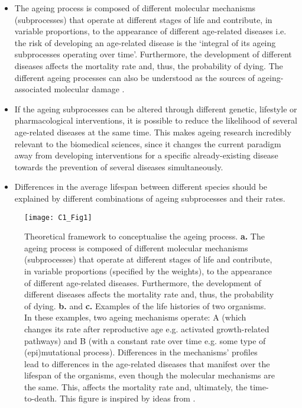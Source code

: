 \begin{itemize}
	
	\item The ageing process is composed of different molecular mechanisms (subprocesses) that operate at different stages of life and contribute, in variable proportions, to the appearance of different age-related diseases i.e. the risk of developing an age-related disease is the `integral of its ageing subprocesses operating over time'. Furthermore, the development of different diseases affects the mortality rate and, thus, the probability of dying. The different ageing processes can also be understood as the sources of ageing-associated molecular damage \cite{Lopez-Otin2013}.
	
	\item If the ageing subprocesses can be altered through different genetic, lifestyle or pharmacological interventions, it is possible to reduce the likelihood of several age-related diseases at the same time. This makes ageing research incredibly relevant to the biomedical sciences, since it changes the current paradigm away from developing interventions for a specific already-existing disease towards the prevention of several diseases simultaneously.
	
	\item  Differences in the average lifespan between different species should be explained by different combinations of ageing subprocesses and their rates.
		
\end{itemize}	

\begin{figure}[htbp!] 
	\centering    
	\texttt{[image: C1\_Fig1]}
	\vspace*{1 mm}
	\caption[Theoretical framework to conceptualise the ageing process]{Theoretical framework to conceptualise the ageing process. \textbf{a.} The ageing process is composed of different molecular mechanisms (subprocesses) that operate at different stages of life and contribute, in variable proportions (specified by the weights), to the appearance of different age-related diseases. Furthermore, the development of different diseases affects the mortality rate and, thus, the probability of dying. \textbf{b.} and \textbf{c.} Examples of the life histories of two organisms. In these examples, two ageing mechanisms operate: A (which changes its rate after reproductive age e.g. activated growth-related pathways) and B (with a constant rate over time e.g. some type of (epi)mutational process). Differences in the mechanisms' profiles lead to differences in the age-related diseases that manifest over the lifespan of the organisms, even though the molecular mechanisms are the same. This, affects the mortality rate and, ultimately, the time-to-death. This figure is inspired by ideas from \cite{Hayflick2007,Gems2015,Peto1997,Stroustrup2016,Freund2019}.}
	\label{fig:c1_fig1}
\end{figure}

